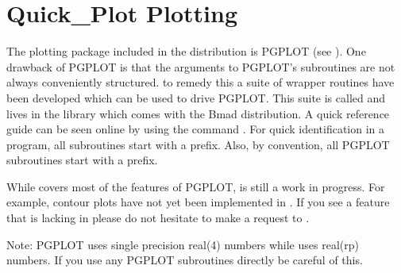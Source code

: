 \chapter{Quick\_Plot Plotting}
\label{c:quick_plot}

The plotting package included in the \bmad distribution is PGPLOT
(see ).
One drawback of PGPLOT is that the arguments to
PGPLOT's subroutines are not always conveniently structured. to remedy
this a suite of wrapper routines have been developed which can be
used to drive PGPLOT. This suite is called \quickplot and lives in the
 library which comes with the Bmad distribution. A quick
reference guide can be seen online by using the command . For quick identification in a program, all \quickplot
subroutines start with a  prefix. Also, by convention, all
PGPLOT subroutines start with a  prefix.

While \quickplot covers most of the features of PGPLOT, \quickplot is
still a work in progress.  For example, contour plots have not yet
been implemented in \quickplot. If you see a feature that is lacking
in \quickplot please do not hesitate to make a request to
.

Note: PGPLOT uses single precision real(4) numbers while \quickplot
uses real(rp) numbers.  If you use any PGPLOT subroutines directly be
careful of this.


